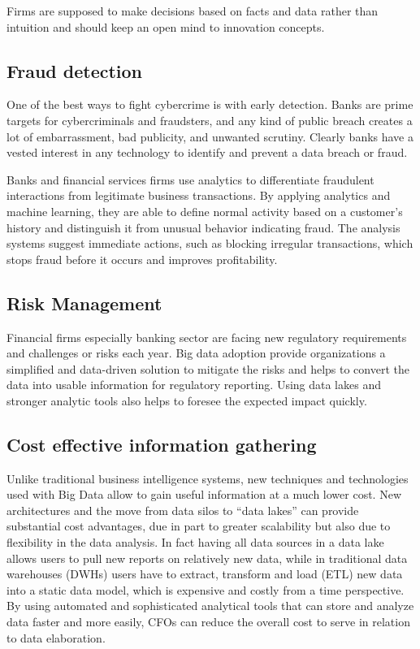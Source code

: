 \documentclass[sigconf]{acmart}
\begin{document}
Firms are supposed to make decisions based on facts and data rather than intuition and should keep an open mind to innovation concepts. 

\subsection{Fraud detection}
One of the best ways to fight cybercrime is with early detection. Banks are prime targets for cybercriminals and fraudsters, and any kind of public breach creates a lot of embarrassment, bad publicity, and unwanted scrutiny. Clearly banks have a vested interest in any technology to identify and prevent a data breach or fraud.\cite{the-top-5-trends-for-big-data-in-financial-services}

Banks and financial services firms use analytics to differentiate fraudulent interactions from legitimate business transactions. By applying analytics and machine learning, they are able to define normal activity based on a customer's history and distinguish it from unusual behavior indicating fraud. The analysis systems suggest immediate actions, such as blocking irregular transactions, which stops fraud before it occurs and improves profitability.\cite{5-big-data-use-cases-in-banking-and-financial-services}

\subsection{Risk Management}
Financial firms especially banking sector are facing new regulatory requirements and challenges or risks each year. Big data adoption provide organizations a simplified and data-driven solution to mitigate the risks and helps to convert the data into usable information for regulatory reporting. Using data lakes and stronger analytic tools   also helps to foresee the expected impact quickly.\cite{https://www-935.ibm.com}

\subsection{Cost effective information gathering}

Unlike traditional business intelligence systems, new techniques and technologies used with Big Data allow to gain useful information at a much lower cost. New architectures and the move from data silos to “data lakes” can provide substantial cost advantages, due in part
to greater scalability but also due to flexibility in the data analysis. In fact having all data sources in a data lake allows users to pull new reports on relatively new data, while in traditional data warehouses (DWHs) users have to extract, transform and load (ETL) new data into a static data model, which is expensive and costly from a time perspective. By using automated and sophisticated analytical tools that can store and analyze data faster and more easily, CFOs can reduce the overall cost to serve in relation to data elaboration.\cite{Accenture-Next-Generation-Financial}
\end{document}
